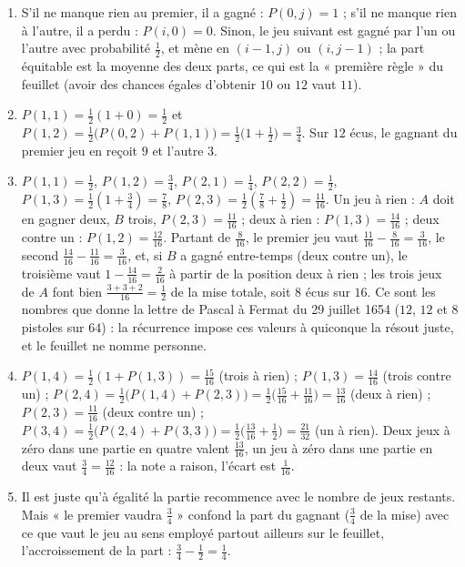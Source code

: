 \documentclass[11pt,a4paper]{article}
\begin{document}
\begin{solution}
\begin{enumerate}
\item S'il ne manque rien au premier, il a gagné : $P(0,j) = 1$ ; s'il ne manque
  rien à l'autre, il a perdu : $P(i,0) = 0$. Sinon, le jeu suivant est gagné par
  l'un ou l'autre avec probabilité $\frac12$, et mène en $(i-1, j)$ ou $(i, j-1)$ ;
  la part équitable est la moyenne des deux parts, ce qui est la « première
  règle » du feuillet (avoir des chances égales d'obtenir $10$ ou $12$ vaut $11$).
\item $P(1,1) = \frac12(1 + 0) = \frac12$ et $P(1,2) = \frac12\bigl(P(0,2) + P(1,1)\bigr)
  = \frac12\bigl(1 + \frac12\bigr) = \frac34$. Sur $12$ écus, le gagnant du premier
  jeu en reçoit $9$ et l'autre $3$.
\item $P(1,1) = \frac12$, $P(1,2) = \frac34$, $P(2,1) = \frac14$, $P(2,2) = \frac12$,
  $P(1,3) = \frac12(1 + \frac34) = \frac78$, $P(2,3) = \frac12(\frac78 + \frac12)
  = \frac{11}{16}$. Un jeu à rien : $A$ doit en gagner deux, $B$ trois,
  $P(2,3) = \frac{11}{16}$ ; deux à rien : $P(1,3) = \frac{14}{16}$ ; deux contre
  un : $P(1,2) = \frac{12}{16}$. Partant de $\frac{8}{16}$, le premier jeu vaut
  $\frac{11}{16} - \frac{8}{16} = \frac{3}{16}$, le second
  $\frac{14}{16} - \frac{11}{16} = \frac{3}{16}$, et, si $B$ a gagné entre-temps
  (deux contre un), le troisième vaut $1 - \frac{14}{16} = \frac{2}{16}$ à partir
  de la position deux à rien ; les trois jeux de $A$ font bien
  $\frac{3+3+2}{16} = \frac12$ de la mise totale, soit $8$ écus sur $16$. Ce sont
  les nombres que donne la lettre de Pascal à Fermat du 29 juillet 1654 ($12$, $12$
  et $8$ pistoles sur $64$) : la récurrence impose ces valeurs à quiconque la
  résout juste, et le feuillet ne nomme personne.
\item $P(1,4) = \frac12(1 + P(1,3)) = \frac{15}{16}$ (trois à rien) ;
  $P(1,3) = \frac{14}{16}$ (trois contre un) ; $P(2,4) = \frac12\bigl(P(1,4) +
  P(2,3)\bigr) = \frac12\bigl(\frac{15}{16} + \frac{11}{16}\bigr) = \frac{13}{16}$
  (deux à rien) ; $P(2,3) = \frac{11}{16}$ (deux contre un) ;
  $P(3,4) = \frac12\bigl(P(2,4) + P(3,3)\bigr) = \frac12\bigl(\frac{13}{16} +
  \frac12\bigr) = \frac{21}{32}$ (un à rien). Deux jeux à zéro dans une partie en
  quatre valent $\frac{13}{16}$, un jeu à zéro dans une partie en deux vaut
  $\frac34 = \frac{12}{16}$ : la note a raison, l'écart est $\frac{1}{16}$.
\item Il est juste qu'à égalité la partie recommence avec le nombre de jeux
  restants. Mais « le premier vaudra $\frac34$ » confond la part du gagnant
  ($\frac34$ de la mise) avec ce que vaut le jeu au sens employé partout ailleurs
  sur le feuillet, l'accroissement de la part : $\frac34 - \frac12 = \frac14$.
\end{enumerate}


\end{solution}
\end{document}
